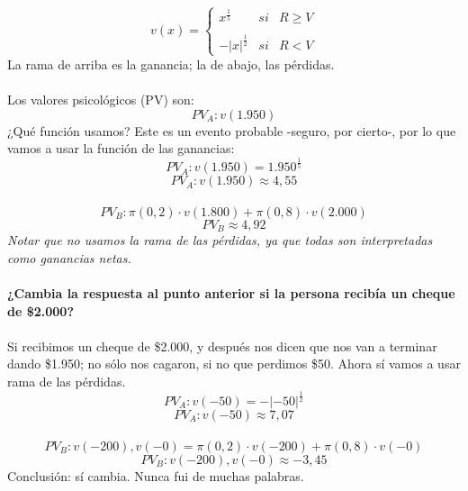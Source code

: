 \documentclass{article}
\begin{document}
        \[v(x) = \left\{\begin{array}{lcc} x^{\frac{1}{5}} & si & R \geq V \\ \\ -|x|^{\frac{1}{2}} & si & R < V\end{array} \right.\]
        La rama de arriba es la ganancia; la de abajo, las pérdidas.
        \\
        \\
        Los valores psicológicos (PV) son:
        \[PV_{A}: v(1.950)\]
        ¿Qué función usamos? Este es un evento probable -seguro, por cierto-, por lo que vamos a usar la función de las ganancias:
        \[PV_{A}: v(1.950) = 1.950^{\frac{1}{5}}\]
        \[PV_{A}: v(1.950) \approx 4,55\]
        \\
        \[PV_{B}: \pi(0,2) \cdot v(1.800) + \pi(0,8) \cdot v(2.000)\]
        \[PV_{B} \approx 4,92\]
        \textit{Notar que no usamos la rama de las pérdidas, ya que todas son interpretadas como ganancias netas.}
        \\
        \\
        \textbf{¿Cambia la respuesta al punto anterior si la persona recibía un cheque de \$2.000?}
        \\
        \\
        Si recibimos un cheque de \$2.000, y después nos dicen que nos van a terminar dando \$1.950; no sólo nos cagaron, si no que perdimos \$50. Ahora sí vamos a usar rama de las pérdidas.
        \\
        \[PV_{A}: v(-50) = -|-50|^{\frac{1}{2}}\]
        \[PV_{A}: v(-50) \approx 7,07\]
        \\
        \[PV_{B}: v(-200), v(-0) = \pi(0,2) \cdot v(-200) + \pi(0,8) \cdot v(-0)\]
        \[PV_{B}: v(-200), v(-0) \approx -3,45\]
        Conclusión: sí cambia. Nunca fui de muchas palabras.
\end{document}
